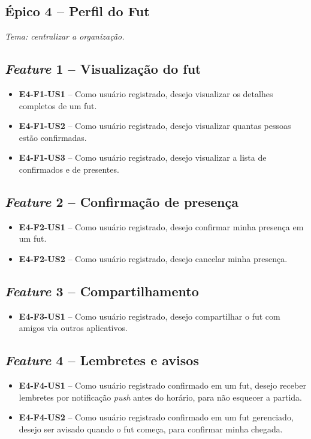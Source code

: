 \begin{apendicesenv}
    \section*{Épico 4 -- Perfil do Fut}
    \textit{Tema: centralizar a organização.}

    \subsection*{\textit{Feature} 1 -- Visualização do fut}
    \begin{itemize}
        \item \textbf{E4-F1-US1} -- Como usuário registrado, desejo visualizar os detalhes completos de um fut.
        \item \textbf{E4-F1-US2} -- Como usuário registrado, desejo visualizar quantas pessoas estão confirmadas.
        \item \textbf{E4-F1-US3} -- Como usuário registrado, desejo visualizar a lista de confirmados e de presentes.
    \end{itemize}

    \subsection*{\textit{Feature} 2 -- Confirmação de presença}
    \begin{itemize}
        \item \textbf{E4-F2-US1} -- Como usuário registrado, desejo confirmar minha presença em um fut.
        \item \textbf{E4-F2-US2} -- Como usuário registrado, desejo cancelar minha presença.
    \end{itemize}

    \subsection*{\textit{Feature} 3 -- Compartilhamento}
    \begin{itemize}
        \item \textbf{E4-F3-US1} -- Como usuário registrado, desejo compartilhar o fut com amigos via outros aplicativos.
    \end{itemize}

    \subsection*{\textit{Feature} 4 -- Lembretes e avisos}
    \begin{itemize}
        \item \textbf{E4-F4-US1} -- Como usuário registrado confirmado em um fut, desejo receber lembretes por notificação \textit{push} antes do horário, para não esquecer a partida.
        \item \textbf{E4-F4-US2} -- Como usuário registrado confirmado em um fut gerenciado, desejo ser avisado quando o fut começa, para confirmar minha chegada.
    \end{itemize}


\end{apendicesenv}
